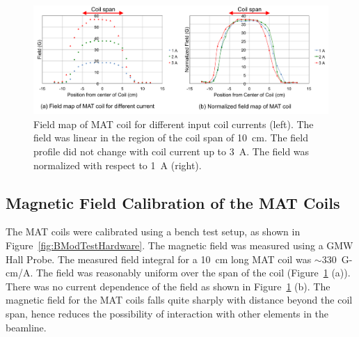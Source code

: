  \begin{singlespace}
\begin{figure}[!h]
	\begin{center}
	\includegraphics[width=15.0cm]{figures/BModMATFieldIntegral}
	\end{center}
	\caption
	{Field map of MAT coil for different input coil currents (left). The field was linear in the region of the coil span of 10~cm. The field profile did not change with coil current up to 3~A. The field was normalized with respect to 1~A (right).}
	\label{fig:BModMATFieldIntegral}
\end{figure}
\end{singlespace}

\subsection{Magnetic Field Calibration of the MAT Coils}
\label{Magnetic Field Calibration of the MAT Coils}
The MAT coils were calibrated using a bench test setup, as shown in Figure~\ref{fig:BModTestHardware}. The magnetic field was measured using a GMW Hall Probe. The measured field integral for a 10~cm long MAT coil was $\sim$330~G-cm/A. The field was reasonably uniform over the span of the coil (Figure~\ref{fig:BModMATFieldIntegral} (a)). There was no current dependence of the field as shown in Figure~\ref{fig:BModMATFieldIntegral} (b). The magnetic field for the MAT coils falls quite sharply with distance beyond the coil span, hence reduces the possibility of interaction with other elements in the beamline.

